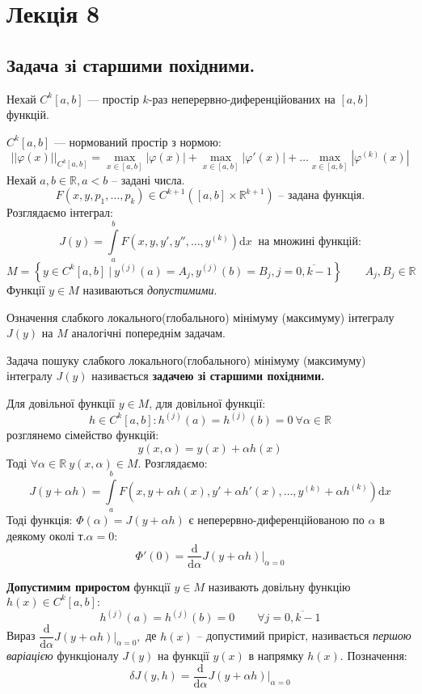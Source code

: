 \section{Лекція 8}
\subsection{Задача зі старшими похідними.}
Нехай $C^k [a,b]$ --- простір $k$-раз неперервно-диференційованих на $[a,b]$ функцій.\par

$C^k[a,b]$ --- нормований простір з нормою:
$$
||\varphi(x)||_{C^k[a,b]} =
\max\limits_{x\in[a,b]}{ |\varphi(x)|} +
 \max\limits_{x\in[a,b]}{|\varphi'(x)|} + \dots
  \max\limits_{x\in[a,b]}{|\varphi^{(k)}(x)|}
$$
Нехай $a,b \in \mathbb{R}, a<b$ -- задані числа.
$$
F(x,y,p_1, \dots, p_k) \in C^{k+1}\left( [a,b] \times \mathbb{R}^{k+1} \right) \text{ -- задана функція.}
$$
Розглядаємо інтеграл:
$$
J(y) =  \int\limits_{a}^{ b}{
F(x, y, y' , y'', \dots , y^{(k)}) \mathrm{d} x
}\  \text{ на множині функцій:}
$$
$$
M = \left\lbrace
y\in C^{k}[a,b] \ \bigg| \  y^{(j)} (a) = A_j , y^{(j)} (b) = B_j , j=\overline{0, k-1}
 \right\rbrace \qquad A_j ,  B_j \in \mathbb{R}
$$
Функції $y \in M$ називаються \textit{допустимими}.
\begin{defo}
Означення слабкого локального(глобального) мінімуму (максимуму) інтегралу $J(y)$ на $M$ аналогічні попереднім задачам.
\end{defo}
\begin{defo}
 Задача пошуку слабкого  локального(глобального) мінімуму (максимуму) інтегралу $J(y)$ називається \textbf{задачею зі старшими похідними.}
\end{defo}
Для довільної функції $y\in M$, для довільної функції:
$$
h \in C^{k}[a,b] : h^{(j)}(a) = h^{(j)}(b) = 0 \ \forall \alpha \in \mathbb{R}
$$
розглянемо сімейство функцій:
$$
y(x, \alpha) = y(x) + \alpha h(x)
$$
Тоді $\forall \alpha \in \mathbb{R} \  y(x, \alpha) \in M$. Розглядаємо:
$$
J(y + \alpha h) =  \int\limits_{a }^{b}{F(x, y + \alpha h(x), y' + \alpha h' (x), \dots , y^{(k)} + \alpha h^{(k)}) \mathrm{d} x}
$$
Тоді функція: $\Phi (\alpha) = J(y + \alpha h)$ є неперервно-диференційованою по $\alpha$ в деякому околі т.$\alpha = 0$:
$$
\Phi'(0) = \frac{\mathrm{d}}{\mathrm{d} \alpha} J(y + \alpha h)\bigg|_{\alpha = 0}
$$
\begin{defo}
 \textbf{Допустимим приростом} функції $y\in M$ називають довільну функцію $h(x) \in C^k[a,b]:$
 $$
 h^{(j)} (a) = h^{(j)} (b) = 0 \qquad \forall j = \overline{0, k-1}
 $$
 Вираз $ \dfrac{\mathrm{d}}{\mathrm{d} \alpha} J(y + \alpha h) \bigg|_{\alpha = 0},$ де $h(x)$ -- допустимий приріст, називається \textit{першою варіацією} функціоналу $J(y)$ на функції $y(x)$ в напрямку $h(x)$.
 Позначення:
 $$
 \delta J(y, h) = \frac{\mathrm{d}}{\mathrm{d} \alpha} J (y + \alpha h) \bigg|_{\alpha = 0}
 $$

\end{defo}
